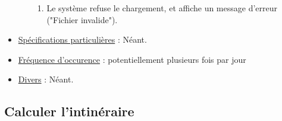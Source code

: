 \documentclass[a4paper, 10pt]{article}
\begin{document}
\begin{itemize}[label = \textbullet, font = \color{orange}]
\begin{enumerate}
        \begin{enumerate}
            \item Le système refuse le chargement, et affiche un message
                d'erreur ("Fichier invalide").
        \end{enumerate}
    \end{enumerate}
    \item \underline{Spécifications particulières} : Néant.
    \item \underline{Fréquence d'occurence} : potentiellement plusieurs fois
        par jour
    \item \underline{Divers} : Néant.
\end{itemize}

\subsection{Calculer l'intinéraire}
\end{document}
